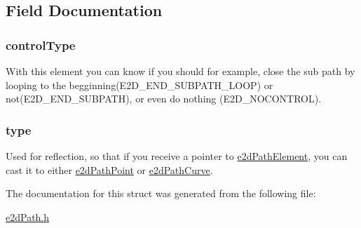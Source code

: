 \subsection{Field Documentation}
\hypertarget{structe2dPathElement_a88af317c0c6d0deb1aacb6cc1acd441d}{
\subsubsection[{control\-Type}]{ {\bf control\-Type}}}\label{structe2dPathElement_a88af317c0c6d0deb1aacb6cc1acd441d}
With this element you can know if you should for example, close the sub path by looping to the begginning(\-E2\-D\-\_\-\-E\-N\-D\-\_\-\-S\-U\-B\-P\-A\-T\-H\-\_\-\-L\-O\-O\-P) or not(\-E2\-D\-\_\-\-E\-N\-D\-\_\-\-S\-U\-B\-P\-A\-T\-H), or even do nothing (E2\-D\-\_\-\-N\-O\-C\-O\-N\-T\-R\-O\-L). \hypertarget{structe2dPathElement_acb2ed01d1856b82777314d8eb8f66b01}{
\subsubsection[{type}]{ {\bf type}}}\label{structe2dPathElement_acb2ed01d1856b82777314d8eb8f66b01}
Used for reflection, so that if you receive a pointer to \hyperlink{structe2dPathElement}{e2d\-Path\-Element}, you can cast it to either \hyperlink{structe2dPathPoint}{e2d\-Path\-Point} or \hyperlink{structe2dPathCurve}{e2d\-Path\-Curve}. 

The documentation for this struct was generated from the following file\-:\begin{DoxyCompactItemize}
\item 
\hyperlink{e2dPath_8h}{e2d\-Path.\-h}\end{DoxyCompactItemize}
